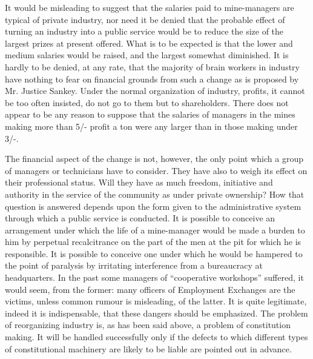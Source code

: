 \documentclass{book}
\begin{document}
It would be misleading to suggest that the salaries paid to mine-managers are typical of private industry, nor need it be denied that the probable effect of turning an industry into a public service would be to reduce the size of the largest prizes at present offered. What is to be expected is that the lower and medium salaries would be raised, and the largest somewhat diminished. It is hardly to be denied, at any rate, that the majority of brain workers in industry have nothing to fear on financial grounds from such a change as is proposed by Mr. Justice Sankey. Under the normal organization of industry, profits, it cannot be too often insisted, do not go to them but to shareholders. There does not appear to be any reason to suppose that the salaries of managers in the mines making more than 5/- profit a ton were any larger than in those making under 3/-.

The financial aspect of the change is not, however, the only point which a group of managers or technicians have to consider. They have also to weigh its effect on their professional status. Will they have as much freedom, initiative and authority in the service of the community as under private ownership? How that question is answered depends upon the form given to the administrative system through which a public service is conducted. It is possible to conceive an arrangement under which the life of a mine-manager would be made a burden to him by perpetual recalcitrance on the part of the men at the pit for which he is responsible. It is possible to conceive one under which he would be hampered to the point of paralysis by irritating interference from a bureaucracy at headquarters. In the past some managers of “cooperative workshops” suffered, it would seem, from the former: many officers of Employment Exchanges are the victims, unless common rumour is misleading, of the latter. It is quite legitimate, indeed it is indispensable, that these dangers should be emphasized. The problem of reorganizing industry is, as has been said above, a problem of constitution making. It will be handled successfully only if the defects to which different types of constitutional machinery are likely to be liable are pointed out in advance.
\end{document}
